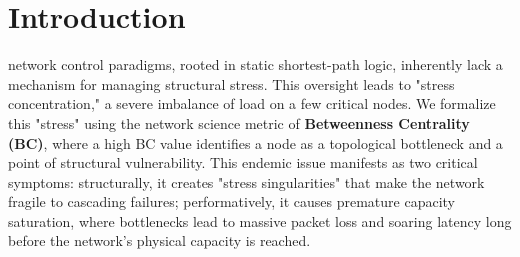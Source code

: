 \documentclass[journal]{IEEEtran}
\begin{document}
\section{Introduction}
\label{sec:introduction}

 network control paradigms, rooted in static shortest-path logic, inherently lack a mechanism for managing structural stress. This oversight leads to "stress concentration," a severe imbalance of load on a few critical nodes. We formalize this "stress" using the network science metric of \textbf{Betweenness Centrality (BC)}, where a high BC value identifies a node as a topological bottleneck and a point of structural vulnerability. This endemic issue manifests as two critical symptoms: structurally, it creates "stress singularities" that make the network fragile to cascading failures; performatively, it causes premature capacity saturation, where bottlenecks lead to massive packet loss and soaring latency long before the network's physical capacity is reached.
\end{document}
